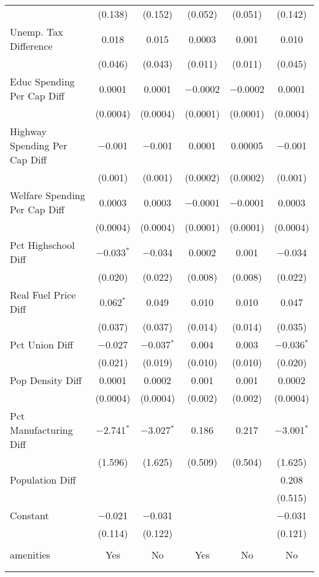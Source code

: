 \begin{table}[!htbp]
\begin{tabular}{@{\extracolsep{5pt}}lccccc}
  & (0.138) & (0.152) & (0.052) & (0.051) & (0.142) \\ 
  Unemp. Tax Difference & 0.018 & 0.015 & 0.0003 & 0.001 & 0.010 \\ 
  & (0.046) & (0.043) & (0.011) & (0.011) & (0.045) \\ 
  Educ Spending Per Cap Diff & 0.0001 & 0.0001 & $-$0.0002 & $-$0.0002 & 0.0001 \\ 
  & (0.0004) & (0.0004) & (0.0001) & (0.0001) & (0.0004) \\ 
  Highway Spending Per Cap Diff & $-$0.001 & $-$0.001 & 0.0001 & 0.00005 & $-$0.001 \\ 
  & (0.001) & (0.001) & (0.0002) & (0.0002) & (0.001) \\ 
  Welfare Spending Per Cap Diff & 0.0003 & 0.0003 & $-$0.0001 & $-$0.0001 & 0.0003 \\ 
  & (0.0004) & (0.0004) & (0.0001) & (0.0001) & (0.0004) \\ 
  Pct Highschool Diff & $-$0.033$^{*}$ & $-$0.034 & 0.0002 & 0.001 & $-$0.034 \\ 
  & (0.020) & (0.022) & (0.008) & (0.008) & (0.022) \\ 
  Real Fuel Price Diff & 0.062$^{*}$ & 0.049 & 0.010 & 0.010 & 0.047 \\ 
  & (0.037) & (0.037) & (0.014) & (0.014) & (0.035) \\ 
  Pct Union Diff & $-$0.027 & $-$0.037$^{*}$ & 0.004 & 0.003 & $-$0.036$^{*}$ \\ 
  & (0.021) & (0.019) & (0.010) & (0.010) & (0.020) \\ 
  Pop Density Diff & 0.0001 & 0.0002 & 0.001 & 0.001 & 0.0002 \\ 
  & (0.0004) & (0.0004) & (0.002) & (0.002) & (0.0004) \\ 
  Pct Manufacturing Diff & $-$2.741$^{*}$ & $-$3.027$^{*}$ & 0.186 & 0.217 & $-$3.001$^{*}$ \\ 
  & (1.596) & (1.625) & (0.509) & (0.504) & (1.625) \\ 
  Population Diff &  &  &  &  & 0.208 \\ 
  &  &  &  &  & (0.515) \\ 
  Constant & $-$0.021 & $-$0.031 &  &  & $-$0.031 \\ 
  & (0.114) & (0.122) &  &  & (0.121) \\ 
 \hline \\[-1.8ex] 
amenities & Yes & No & Yes & No & No \\ 
\hline \\[-1.8ex] 
\hline 
\hline \\[-1.8ex] 
\end{tabular} 
\end{table} 
